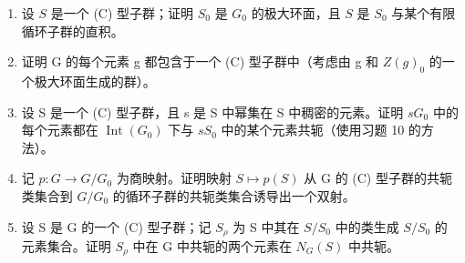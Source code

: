 \begin{enumerate}
\def\labelenumi{\alph{enumi})}
\item
  设 \(S\) 是一个 (C) 型子群；证明 \(S_0\) 是 \(G_0\) 的极大环面，且 \(S\) 是 \(S_0\) 与某个有限循环子群的直积。
\item
  证明 G 的每个元素 g 都包含于一个 (C) 型子群中（考虑由 g 和 \(Z(g)_{0}\) 的一个极大环面生成的群）。
\item
  设 S 是一个 (C) 型子群，且 s 是 S 中幂集在 S 中稠密的元素。证明 \(sG_{0}\) 中的每个元素都在 \(\operatorname{Int}(G_{0})\) 下与 \(sS_{0}\) 中的某个元素共轭（使用习题 10 的方法）。
\item
  记 \(p: G \to G/G_{0}\) 为商映射。证明映射 \(S \mapsto p(S)\) 从 G 的 (C) 型子群的共轭类集合到 \(G/G_{0}\) 的循环子群的共轭类集合诱导出一个双射。
\item
  设 S 是 G 的一个 (C) 型子群；记 \(S_{\rho}\) 为 S 中其在 \(S/S_{0}\) 中的类生成 \(S/S_{0}\) 的元素集合。证明 \(S_{\rho}\) 中在 G 中共轭的两个元素在 \(N_{G}(S)\) 中共轭。
\end{enumerate}
\relax{}

